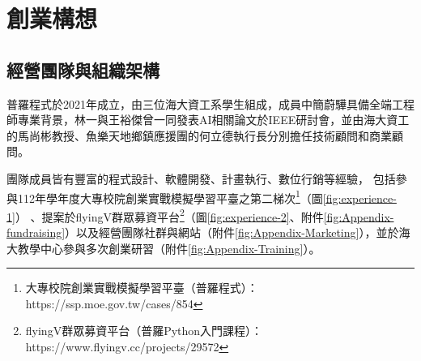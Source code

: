 \section{創業構想}
\subsection{經營團隊與組織架構}

普羅程式於2021年成立，由三位海大資工系學生組成，成員中簡蔚驊具備全端工程師專業背景，林一與王裕傑曾一同發表AI相關論文於IEEE研討會，並由海大資工的馬尚彬教授、魚樂天地鄉鎮應援團的何立德執行長分別擔任技術顧問和商業顧問。

團隊成員皆有豐富的程式設計、軟體開發、計畫執行、數位行銷等經驗，
包括參與112年學年度大專校院創業實戰模擬學習平臺之第二梯次\footnote{大專校院創業實戰模擬學習平臺（普羅程式）：https://ssp.moe.gov.tw/cases/854}（圖\ref{fig:experience-1}）
、提案於flyingV群眾募資平台\footnote{flyingV群眾募資平台（普羅Python入門課程）：https://www.flyingv.cc/projects/29572}（圖\ref{fig:experience-2}、附件\ref{fig:Appendix-fundraising}）以及經營團隊社群與網站（附件\ref{fig:Appendix-Marketing}），並於海大教學中心參與多次創業研習（附件\ref{fig:Appendix-Training}）。


